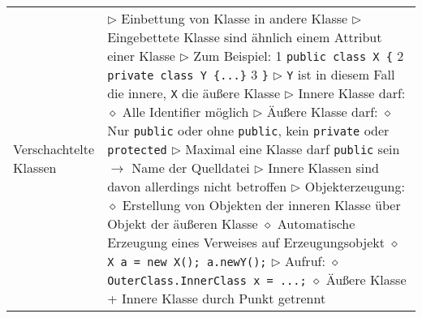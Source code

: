 \begin{longtable}{ | p{} p{} | }
	\makecell[l]{Verschachtelte \\ Klassen} & \makecell[l]{
	$\triangleright$ Einbettung von Klasse in andere Klasse \\
	$\triangleright$ Eingebettete Klasse sind ähnlich einem Attribut einer Klasse \\
	$\triangleright$ Zum Beispiel:
	\hspace{0.4cm} 1 \hspace{0.1cm} \texttt{public class X \{} \\
	\hspace{0.4cm} 2 \hspace{0.5cm} \texttt{private class Y \{...\}} \\
	\hspace{0.4cm} 3 \hspace{0.1cm} \texttt{\}} \\
	$\triangleright$ \texttt{Y} ist in diesem Fall die innere, \texttt{X} die äu\ss ere Klasse \\
	$\triangleright$ Innere Klasse darf: \\
	\hspace{0.4cm} $\diamond$ Alle Identifier möglich \\
	$\triangleright$ Äu\ss ere Klasse darf: \\
	\hspace{0.4cm} $\diamond$ Nur \texttt{public} oder ohne \texttt{public}, kein \texttt{private} oder \texttt{protected} \\
	$\triangleright$ Maximal eine Klasse darf \texttt{public} sein $\rightarrow$ Name der Quelldatei \\
	$\triangleright$ Innere Klassen sind davon allerdings nicht betroffen \\
	$\triangleright$ Objekterzeugung: \\
	\hspace{0.4cm} $\diamond$ Erstellung von Objekten der inneren Klasse über Objekt der äu\ss eren Klasse \\ 
	\hspace{0.4cm} $\diamond$ Automatische Erzeugung eines Verweises auf Erzeugungsobjekt \\
	\hspace{0.4cm} $\diamond$ \texttt{X a = new X(); a.newY();} \\
	$\triangleright$  Aufruf: \\
	\hspace{0.4cm} $\diamond$ \texttt{OuterClass.InnerClass x = ...;} \\
	\hspace{0.4cm} $\diamond$ Äu\ss ere Klasse + Innere Klasse durch Punkt getrennt \\
}
\end{longtable}
